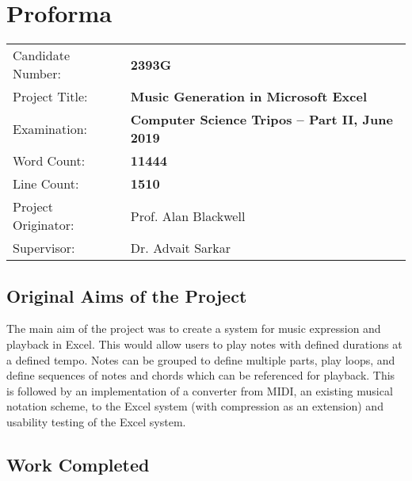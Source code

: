 \newpage

\chapter*{Proforma}

{\large
\begin{tabular}{ll}
Candidate Number:   & \bf 2393G                                \\
Project Title:      & \bf Music Generation in Microsoft Excel \\
Examination:        & \bf Computer Science Tripos -- Part II, June 2019  \\
Word Count:         & \bf 11444\footnotemark[1]  \\
Line Count:         & \bf 1510\footnotemark[2]  \\
Project Originator: & Prof. Alan Blackwell                    \\
Supervisor:         & Dr. Advait Sarkar                    \\
\end{tabular}
}


\section*{Original Aims of the Project}

The main aim of the project was to create a system for music expression and playback in Excel. This would allow users to play notes with defined durations at a defined tempo. Notes can be grouped to define multiple parts, play loops, and define sequences of notes and chords which can be referenced for playback. This is followed by an implementation of a converter from MIDI, an existing musical notation scheme, to the Excel system (with compression as an extension) and usability testing of the Excel system.

\section*{Work Completed}

